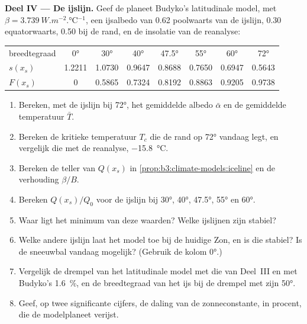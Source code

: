 \begin{problem}
\medskip\noindent\textbf{Deel IV --- De ijslijn.} Geef de planeet
Budyko's latitudinale model, met $\beta = \qty{3.739}{W.m^{-2}.\celsius^{-1}}$,
een ijsalbedo van 0.62 poolwaarts van de ijslijn, 0.30 equatorwaarts, 0.50 bij
de rand, en de insolatie van de reanalyse:
\begin{center}
\begin{tabular}{lccccccc}
\hline
breedtegraad & \ang{0} & \ang{30} & \ang{40} & \ang{47.5} & \ang{55} & \ang{60} & \ang{72}\\
$s(x_s)$ & 1.2211 & 1.0730 & 0.9647 & 0.8688 & 0.7650 & 0.6947 & 0.5643\\
$F(x_s)$ & 0 & 0.5865 & 0.7324 & 0.8192 & 0.8863 & 0.9205 & 0.9738\\
\hline
\end{tabular}
\end{center}
\begin{enumerate}[resume]
\item Bereken, met de ijslijn bij \ang{72}, het gemiddelde albedo $\bar\alpha$
  en de gemiddelde temperatuur $\bar T$.
\item Bereken de kritieke temperatuur $T_c$ die de rand op
  \ang{72} vandaag legt, en vergelijk die met de reanalyse, \qty{-15.8}{\celsius}.
\item Bereken de teller van $Q(x_s)$ in \cref{prop:b3:climate-models:iceline}
  en de verhouding $\beta/B$.
\item Bereken $Q(x_s)/Q_0$ voor de ijslijn bij \ang{30}, \ang{40},
  \ang{47.5}, \ang{55} en \ang{60}.
\item Waar ligt het minimum van deze waarden? Welke ijslijnen zijn stabiel?
\item Welke andere ijslijn laat het model toe bij de huidige Zon, en is
  die stabiel? Is de sneeuwbal vandaag mogelijk? (Gebruik de kolom \ang{0}.)
\item Vergelijk de drempel van het latitudinale model met die van Deel~III
  en met Budyko's \qty{1.6}{\percent}, en de breedtegraad van het ijs bij de
  drempel met zijn \ang{50}.
\item Geef, op twee significante cijfers, de daling van de zonneconstante, in
  procent, die de modelplaneet verijst.
\end{enumerate}
\end{problem}
